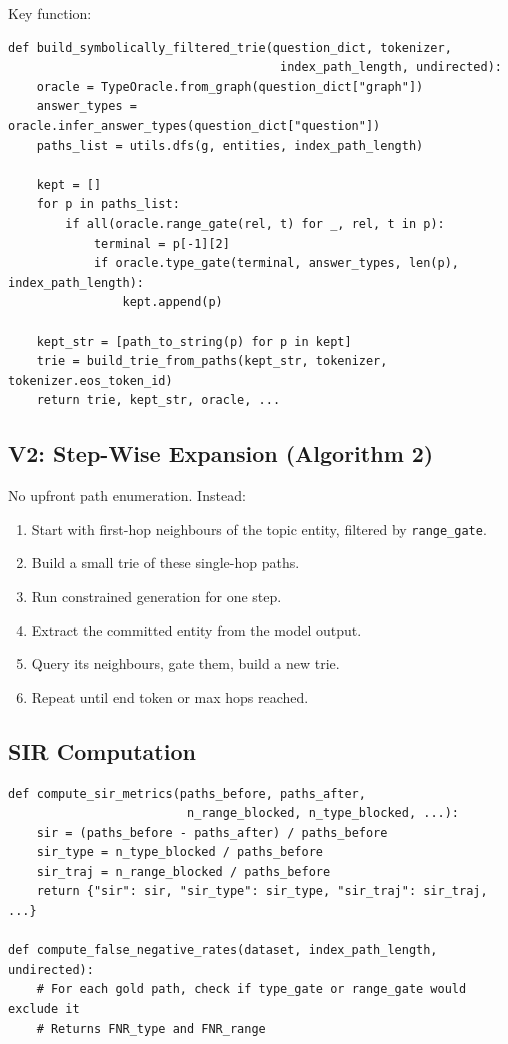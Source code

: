\documentclass[11pt,a4paper,oneside,openany]{book}
\theoremstyle{definition}
\newcommand{\code}[1]{\texttt{#1}}
\begin{document}
Key function:

\begin{lstlisting}
def build_symbolically_filtered_trie(question_dict, tokenizer,
                                      index_path_length, undirected):
    oracle = TypeOracle.from_graph(question_dict["graph"])
    answer_types = oracle.infer_answer_types(question_dict["question"])
    paths_list = utils.dfs(g, entities, index_path_length)

    kept = []
    for p in paths_list:
        if all(oracle.range_gate(rel, t) for _, rel, t in p):
            terminal = p[-1][2]
            if oracle.type_gate(terminal, answer_types, len(p), index_path_length):
                kept.append(p)

    kept_str = [path_to_string(p) for p in kept]
    trie = build_trie_from_paths(kept_str, tokenizer, tokenizer.eos_token_id)
    return trie, kept_str, oracle, ...
\end{lstlisting}

\subsection{V2: Step-Wise Expansion (Algorithm 2)}

No upfront path enumeration. Instead:

\begin{enumerate}
	\item Start with first-hop neighbours of the topic entity, filtered by \code{range\_gate}.
	\item Build a small trie of these single-hop paths.
	\item Run constrained generation for one step.
	\item Extract the committed entity from the model output.
	\item Query its neighbours, gate them, build a new trie.
	\item Repeat until end token or max hops reached.
\end{enumerate}

\subsection{SIR Computation}

\begin{lstlisting}
def compute_sir_metrics(paths_before, paths_after,
                         n_range_blocked, n_type_blocked, ...):
    sir = (paths_before - paths_after) / paths_before
    sir_type = n_type_blocked / paths_before
    sir_traj = n_range_blocked / paths_before
    return {"sir": sir, "sir_type": sir_type, "sir_traj": sir_traj, ...}

def compute_false_negative_rates(dataset, index_path_length, undirected):
    # For each gold path, check if type_gate or range_gate would exclude it
    # Returns FNR_type and FNR_range
\end{lstlisting}
\end{document}
